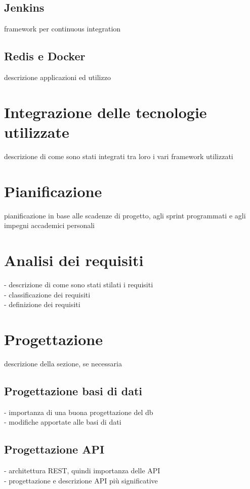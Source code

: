 \subsection{Jenkins}
framework per continuous integration
\subsection{Redis e Docker}
descrizione applicazioni ed utilizzo

\section{Integrazione delle tecnologie utilizzate}
descrizione di come sono stati integrati tra loro i vari framework utilizzati

\section{Pianificazione}
pianificazione in base alle scadenze di progetto, agli sprint programmati e agli impegni accademici personali

\section{Analisi dei requisiti}
- descrizione di come sono stati stilati i requisiti\\
- classificazione dei requisiti\\
- definizione dei requisiti\\

\section{Progettazione}
descrizione della sezione, se necessaria
\subsection{Progettazione basi di dati}
- importanza di una buona progettazione del db\\
- modifiche apportate alle basi di dati\\

\subsection{Progettazione API}
- architettura REST, quindi importanza delle API\\
- progettazione e descrizione API più significative\\

